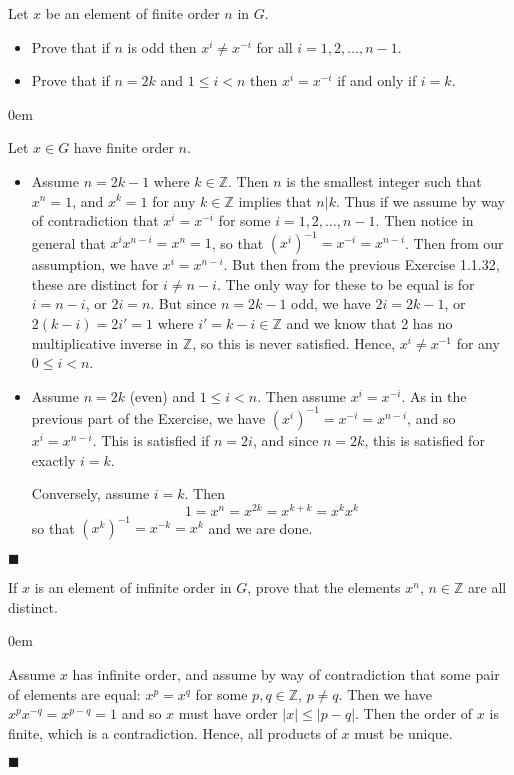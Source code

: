 \documentclass[12pt]{article}
\renewcommand{\qed}{\hfill$\blacksquare$}
\renewenvironment{proof}{\begin{addmargin}[1em]{0em}\begin{newproof}}{\end{newproof}\end{addmargin}\qed}
\newenvironment{problem}[2][Exercise]{\begin{trivlist}
\item[\hskip \labelsep {\bfseries #1}\hskip \labelsep {\bfseries #2.}]}{\end{trivlist}}
\begin{document}
\begin{problem}{1.1.33}
Let $x$ be an element of finite order $n$ in $G$.
\begin{itemize}
    \item Prove that if $n$ is odd then $x^i \neq x^{-i}$ for all $i=1,2,\ldots,n-1$.
    \item Prove that if $n=2k$ and $1\leq i < n$ then $x^i=x^{-i}$ if and only if $i=k$.
\end{itemize}
\end{problem}
\begin{proof}
Let $x\in G$ have finite order $n$.
\begin{itemize}
    \item Assume $n=2k-1$ where $k\in \mathbb{Z}$. Then $n$ is the smallest integer such that $x^n=1$, and $x^k=1$ for any $k\in \mathbb{Z}$ implies that $n | k$. Thus if we assume by way of contradiction that $x^i = x^{-i}$ for some $i=1,2,\ldots,n-1$. Then notice in general that $x^i x^{n-i} = x^n = 1$, so that $\left(x^i\right)^{-1}=x^{-i}=x^{n-i}$. Then from our assumption, we have $x^i = x^{n-i}$. But then from the previous Exercise 1.1.32, these are distinct for $i \neq n-i$. The only way for these to be equal is for $i=n-i$, or $2i=n$. But since $n=2k-1$ odd, we have $2i=2k-1$, or $2\left(k-i\right)=2i'=1$ where $i'=k-i\in \mathbb{Z}$ and we know that 2 has no multiplicative inverse in $\mathbb{Z}$, so this is never satisfied. Hence, $x^i \neq x^{-1}$ for any $0\leq i < n$.

    \item Assume $n=2k$ (even) and $1\leq i < n$. Then assume $x^i = x^{-i}$. As in the previous part of the Exercise, we have $\left(x^i\right)^{-1} = x^{-i} = x^{n-i} $, and so $x^{i} = x^{n-i}$. This is satisfied if $n=2i$, and since $n=2k$, this is satisfied for exactly $i=k$.

    Conversely, assume $i=k$. Then $$ 1 = x^n = x^{2k} = x^{k+k}=x^k x^k $$ so that $\left(x^k\right)^{-1} = x^{-k}=x^k$ and we are done.
\end{itemize}
\end{proof}





\begin{problem}{1.1.34}
If $x$ is an element of infinite order in $G$, prove that the elements $x^n$, $n\in \mathbb{Z}$ are all distinct.
\end{problem}
\begin{proof}
Assume $x$ has infinite order, and assume by way of contradiction that some pair of elements are equal: $x^p = x^q$ for some $p,q\in \mathbb{Z}$, $p\neq q$. Then we have $x^px^{-q} = x^{p-q} = 1$ and so $x$ must have order $\left|x\right|\leq \left|p-q\right|$. Then the order of $x$ is finite, which is a contradiction. Hence, all products of $x$ must be unique.
\end{proof}
\end{document}
